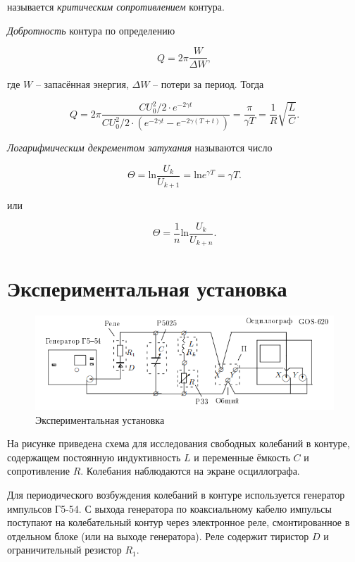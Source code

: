 называется \textit{критическим сопротивлением} контура.

\textit{Добротность} контура по определению 

\begin{equation}
    Q = 2\pi \dfrac{W}{\Delta W},
\end{equation}

где $W$ -- запасённая энергия, $\Delta W$ -- потери за период. Тогда

\begin{equation}
    Q = 2\pi\dfrac{CU_0^2/2 \cdot e^{-2\gamma t}}{CU_0^2/2 \cdot (e^{-2\gamma t} - e^{-2\gamma (T+t)})}=\dfrac{\pi}{\gamma T}=\dfrac{1}{R}\sqrt{\dfrac{L}{C}}.
\end{equation}

\textit{Логарифмическим декрементом затухания} называются число

\begin{equation}
    \Theta = \text{ln}\dfrac{U_k}{U_{k+1}}=\text{ln} e^{\gamma T}=\gamma T.
\end{equation}

или 

\begin{equation}
    \Theta = \dfrac{1}{n} \text{ln}\dfrac{U_k}{U_{k+n}}.
\end{equation}

\section{Экспериментальная установка}

\begin{figure}[h]
    \centering
    \includegraphics[width = 12 cm]{images/1.png}
    \caption{Экспериментальная установка}
    \label{eksp_ust}
\end{figure}


На рисунке приведена схема для исследования свободных колебаний в контуре, содержащем постоянную индуктивность $L$ и переменные ёмкость $C$ и сопротивление $R$. Колебания наблюдаются на экране осциллографа.

Для периодического возбуждения колебаний в контуре используется генератор импульсов Г5-54. С выхода генератора по коаксиальному кабелю импульсы поступают на колебательный контур через электронное реле, смонтированное в отдельном блоке (или на выходе генератора). Реле содержит тиристор $D$ и ограничительный резистор $R_1$.

